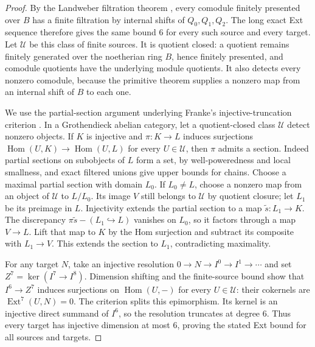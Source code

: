 \begin{proof}
By the Landweber filtration theorem
\cite[Theorem~5.7]{HS2005}, every comodule finitely presented over $B$
has a finite filtration by internal shifts of $Q_0,Q_1,Q_2$. The long
exact Ext sequence therefore gives the same bound $6$ for every such
source and every target. Let $\mathscr U$ be this class of finite
sources. It is quotient closed: a quotient remains finitely generated
over the noetherian ring $B$, hence finitely presented, and comodule
quotients have the underlying module quotients. It also detects every
nonzero comodule, because the primitive theorem
\cite[Theorem~5.1]{HS2005} supplies a nonzero map from an internal shift
of $B$ to each one.

We use the partial-section argument underlying Franke's
injective-truncation criterion
\cite[Section~3.4.3, Lemma~2]{Franke1996}. In a Grothendieck abelian
category, let a quotient-closed class $\mathscr U$ detect nonzero
objects. If $K$ is injective and $\pi:K\to L$ induces surjections
$\operatorname{Hom}(U,K)\to\operatorname{Hom}(U,L)$ for every
$U\in\mathscr U$, then $\pi$ admits a section. Indeed partial sections
on subobjects of $L$ form a set, by well-poweredness and local
smallness, and exact filtered unions give upper bounds for chains.
Choose a maximal partial section with domain $L_0$. If $L_0\ne L$,
choose a nonzero map from an object of $\mathscr U$ to $L/L_0$.
Its image $V$ still belongs to $\mathscr U$ by quotient closure; let
$L_1$ be its preimage in $L$. Injectivity extends the partial section
to a map $\widetilde s:L_1\to K$. The discrepancy
$\pi\widetilde s-(L_1\hookrightarrow L)$ vanishes on $L_0$, so it
factors through a map $V\to L$. Lift that map to $K$ by the Hom
surjection and subtract its composite with $L_1\to V$. This extends
the section to $L_1$, contradicting maximality.

For any target $N$, take an injective resolution
$0\to N\to I^0\to I^1\to\cdots$ and set
$Z^7=\ker(I^7\to I^8)$. Dimension shifting and the finite-source
bound show that $I^6\to Z^7$ induces surjections on
$\operatorname{Hom}(U,-)$ for every $U\in\mathscr U$: their cokernels
are $\operatorname{Ext}^7(U,N)=0$. The criterion splits this
epimorphism. Its kernel is an injective direct summand of $I^6$, so
the resolution truncates at degree $6$. Thus every target has
injective dimension at most $6$, proving the stated Ext bound for
all sources and targets.


\end{proof}
